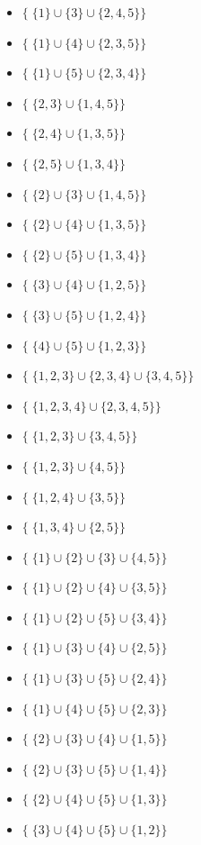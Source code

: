 \begin{enumerate}
\begin{itemize}
\begin{itemize}
                \item $\{\; \{1\}\cup \{3\} \cup \{2,4,5\} \}$
                \item $\{\; \{1\}\cup \{4\} \cup \{2,3,5\} \}$
                \item $\{\; \{1\}\cup \{5\} \cup \{2,3, 4\} \}$
                \item $\{\; \{2,3\} \cup \{1,4,5\} \}$
                \item $\{\; \{2,4\} \cup \{1,3,5\} \}$
                \item $\{\; \{2,5\} \cup \{1,3,4\} \}$
                \item $\{\; \{2\}\cup \{3\} \cup \{1,4,5\} \}$
                \item $\{\; \{2\}\cup \{4\} \cup \{1,3,5\} \}$
                \item $\{\; \{2\}\cup \{5\} \cup \{1,3,4\} \}$
                \item $\{\; \{3\}\cup \{4\} \cup \{1,2,5\} \}$ %
                \item $\{\; \{3\}\cup \{5\} \cup \{1,2,4\} \}$ %
                \item $\{\; \{4\}\cup \{5\} \cup \{1,2,3\} \}$ %
                \item $\{\; \{1,2,3\}\cup \{2,3,4\} \cup \{3,4,5\} \}$
                \item $\{\; \{1,2,3,4\}\cup \{2,3,4,5\}\}$
                \item $\{\; \{1,2,3\}\cup \{3,4,5\}\}$
                \item $\{\; \{1,2,3\}\cup \{4,5\}\}$
                \item $\{\; \{1,2,4\}\cup \{3,5\}\}$
                \item $\{\; \{1,3,4\}\cup \{2,5\}\}$
                \item $\{\; \{1\}\cup \{2\} \cup \{3\} \cup \{4,5\} \}$
                \item $\{\; \{1\}\cup \{2\} \cup \{4\} \cup \{3,5\} \}$
                \item $\{\; \{1\}\cup \{2\} \cup \{5\} \cup \{3,4\} \}$
                \item $\{\; \{1\}\cup \{3\} \cup \{4\} \cup \{2,5\} \}$
                \item $\{\; \{1\}\cup \{3\} \cup \{5\} \cup \{2,4\} \}$
                \item $\{\; \{1\}\cup \{4\} \cup \{5\} \cup \{2,3\} \}$
                \item $\{\; \{2\}\cup \{3\} \cup \{4\} \cup \{1,5\} \}$
                \item $\{\; \{2\}\cup \{3\} \cup \{5\} \cup \{1,4\} \}$
                \item $\{\; \{2\}\cup \{4\} \cup \{5\} \cup \{1,3\} \}$
                \item $\{\; \{3\}\cup \{4\} \cup \{5\} \cup \{1,2\} \}$
            \end{itemize}
    \end{itemize}
    

\end{enumerate}
